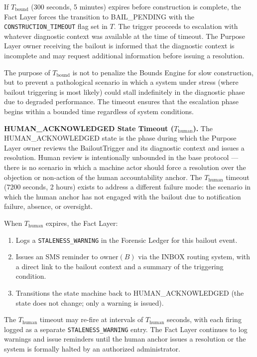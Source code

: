 If $T_{\text{bound}}$ (300 seconds, 5 minutes) expires before construction is complete, the Fact Layer forces the transition to BAIL\_PENDING with the \texttt{CONSTRUCTION\_TIMEOUT} flag set in $T$. The trigger proceeds to escalation with whatever diagnostic context was available at the time of timeout. The Purpose Layer owner receiving the bailout is informed that the diagnostic context is incomplete and may request additional information before issuing a resolution.

The purpose of $T_{\text{bound}}$ is not to penalize the Bounds Engine for slow construction, but to prevent a pathological scenario in which a system under stress (where bailout triggering is most likely) could stall indefinitely in the diagnostic phase due to degraded performance. The timeout ensures that the escalation phase begins within a bounded time regardless of system conditions.

\bigskip

\noindent\textbf{HUMAN\_ACKNOWLEDGED State Timeout ($T_{\text{human}}$).} The HUMAN\_ACKNOWLEDGED state is the phase during which the Purpose Layer owner reviews the BailoutTrigger and its diagnostic context and issues a resolution. Human review is intentionally unbounded in the base protocol --- there is no scenario in which a machine actor should force a resolution over the objection or non-action of the human accountability anchor. The $T_{\text{human}}$ timeout (7200 seconds, 2 hours) exists to address a different failure mode: the scenario in which the human anchor has not engaged with the bailout due to notification failure, absence, or oversight.

When $T_{\text{human}}$ expires, the Fact Layer:
\begin{enumerate}\setlength\itemsep{0.25em}
\item Logs a \texttt{STALENESS\_WARNING} in the Forensic Ledger for this bailout event.
\item Issues an SMS reminder to $\text{owner}(B)$ via the INBOX routing system, with a direct link to the bailout context and a summary of the triggering condition.
\item Transitions the state machine back to HUMAN\_ACKNOWLEDGED (the state does not change; only a warning is issued).
\end{enumerate}

The $T_{\text{human}}$ timeout may re-fire at intervals of $T_{\text{human}}$ seconds, with each firing logged as a separate \texttt{STALENESS\_WARNING} entry. The Fact Layer continues to log warnings and issue reminders until the human anchor issues a resolution or the system is formally halted by an authorized administrator.

